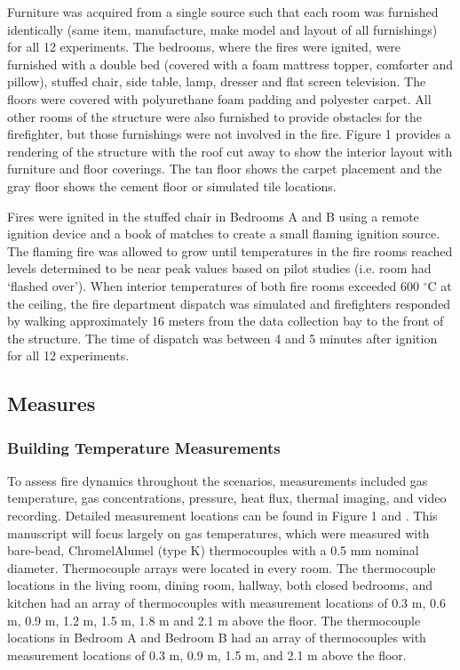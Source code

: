 \documentclass[12pt,oneside]{article}
\begin{document}
Furniture was acquired from a single source such that each room was furnished identically (same item, manufacture, make model and layout of all furnishings) for all 12 experiments. The bedrooms, where the fires were ignited, were furnished with a double bed (covered with a foam mattress topper, comforter and pillow), stuffed chair, side table, lamp, dresser and flat screen television.  The floors were covered with polyurethane foam padding and polyester carpet.  All other rooms of the structure were also furnished to provide obstacles for the firefighter, but those furnishings were not involved in the fire. Figure 1 provides a rendering of the structure with the roof cut away to show the interior layout with furniture and floor coverings.  The tan floor shows the carpet placement and the gray floor shows the cement floor or simulated tile locations.  

Fires were ignited in the stuffed chair in Bedrooms  A and B using a remote ignition device and a book of matches to create a small flaming ignition source.  The flaming fire was allowed to grow until temperatures in the fire rooms reached levels determined to be near peak values based on pilot studies (i.e. room had `flashed over').  When interior temperatures of both fire rooms exceeded 600 $^{\circ}$C at the ceiling, the fire department dispatch was simulated and firefighters responded by walking approximately 16 meters from the data collection bay to the front of the structure.  The time of dispatch was between 4 and 5 minutes after ignition for all 12 experiments.  

\subsection{Measures}

\subsubsection{Building Temperature Measurements}
To assess fire dynamics throughout the  scenarios, measurements included gas temperature, gas concentrations, pressure, heat flux, thermal imaging, and video recording. Detailed measurement locations can be found in Figure 1 and \cite{Horn:2016}. This manuscript will focus largely on gas temperatures, which were measured with bare-bead, ChromelAlumel (type K) thermocouples with a 0.5 mm nominal diameter. Thermocouple arrays were located in every room. The thermocouple locations in the living room, dining room, hallway, both closed bedrooms, and kitchen had an array of thermocouples with measurement locations of 0.3 m, 0.6 m, 0.9 m, 1.2 m, 1.5 m, 1.8 m and 2.1 m above the floor. The thermocouple locations in Bedroom A and Bedroom B had an array of thermocouples with measurement locations of 0.3 m, 0.9 m, 1.5 m, and 2.1 m above the floor. 
\end{document}
